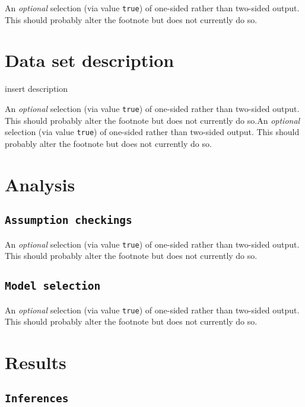 \documentclass[letterpaper,9pt,twocolumn,twoside,]{pinp}
\begin{document}
An \emph{optional} selection (via value \texttt{true}) of one-sided
rather than two-sided output. This should probably alter the footnote
but does not currently do so.

\hypertarget{data-set-description}{%
\section{Data set description}\label{data-set-description}}

insert description

An \emph{optional} selection (via value \texttt{true}) of one-sided
rather than two-sided output. This should probably alter the footnote
but does not currently do so.An \emph{optional} selection (via value
\texttt{true}) of one-sided rather than two-sided output. This should
probably alter the footnote but does not currently do so.

\hypertarget{analysis}{%
\section{Analysis}\label{analysis}}

\hypertarget{assumption-checkings}{%
\subsection{\texorpdfstring{\texttt{Assumption\ checkings}}{Assumption checkings}}\label{assumption-checkings}}

An \emph{optional} selection (via value \texttt{true}) of one-sided
rather than two-sided output. This should probably alter the footnote
but does not currently do so.

\hypertarget{model-selection}{%
\subsection{\texorpdfstring{\texttt{Model\ selection}}{Model selection}}\label{model-selection}}

An \emph{optional} selection (via value \texttt{true}) of one-sided
rather than two-sided output. This should probably alter the footnote
but does not currently do so.

\hypertarget{results}{%
\section{Results}\label{results}}

\hypertarget{inferences}{%
\subsection{\texorpdfstring{\texttt{Inferences}}{Inferences}}\label{inferences}}
\end{document}
